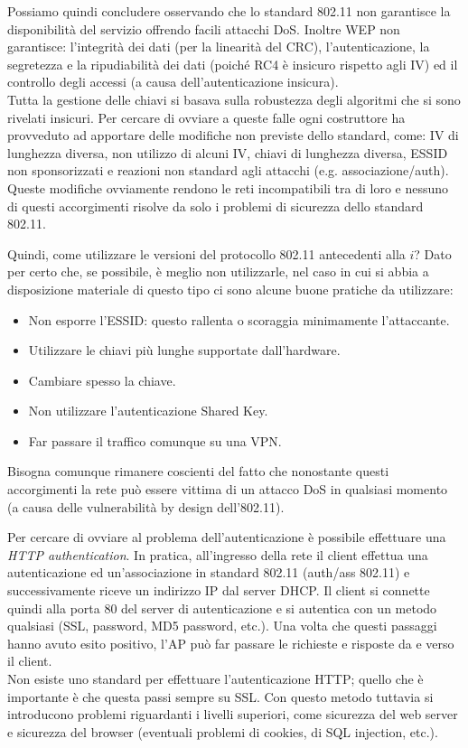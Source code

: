 Possiamo quindi concludere osservando che lo standard 802.11 non garantisce la disponibilità del servizio offrendo facili attacchi DoS. Inoltre WEP non garantisce: l'integrità dei dati (per la linearità del CRC), l'autenticazione, la segretezza e la ripudiabilità dei dati (poiché RC4 è insicuro rispetto agli IV) ed il controllo degli accessi (a causa dell'autenticazione insicura).\\
Tutta la gestione delle chiavi si basava sulla robustezza degli algoritmi che si sono rivelati insicuri. Per cercare di ovviare a queste falle ogni costruttore ha provveduto ad apportare delle modifiche non previste dello standard, come: IV di lunghezza diversa, non utilizzo di alcuni IV, chiavi di lunghezza diversa, ESSID non sponsorizzati e reazioni non standard agli attacchi (e.g. associazione/auth). Queste modifiche ovviamente rendono le reti incompatibili tra di loro e nessuno di questi accorgimenti risolve da solo i problemi di sicurezza dello standard 802.11.

Quindi, come utilizzare le versioni del protocollo 802.11 antecedenti alla $i$? Dato per certo che, se possibile, è meglio non utilizzarle, nel caso in cui si abbia a disposizione materiale di questo tipo ci sono alcune buone pratiche da utilizzare:
\begin{itemize}
	\item Non esporre l'ESSID: questo rallenta o scoraggia minimamente l'attaccante.
	\item Utilizzare le chiavi più lunghe supportate dall'hardware.
	\item Cambiare spesso la chiave.
	\item Non utilizzare l'autenticazione Shared Key.
	\item Far passare il traffico comunque su una VPN.
\end{itemize}
Bisogna comunque rimanere coscienti del fatto che nonostante questi accorgimenti la rete può essere vittima di un attacco DoS in qualsiasi momento (a causa delle vulnerabilità by design dell'802.11).

Per cercare di ovviare al problema dell'autenticazione è possibile effettuare una \textit{HTTP authentication}. In pratica, all'ingresso della rete il client effettua una autenticazione ed un'associazione in standard 802.11 (auth/ass 802.11) e successivamente riceve un indirizzo IP dal server DHCP. Il client si connette quindi alla porta 80 del server di autenticazione e si autentica con un metodo qualsiasi (SSL, password, MD5 password, etc.). Una volta che questi passaggi hanno avuto esito positivo, l'AP può far passare le richieste e risposte da e verso il client.\\
Non esiste uno standard per effettuare l'autenticazione HTTP; quello che è importante è che questa passi sempre su SSL. Con questo metodo tuttavia si introducono problemi riguardanti i livelli superiori, come sicurezza del web server e sicurezza del browser (eventuali problemi di cookies, di SQL injection, etc.). \newpage

